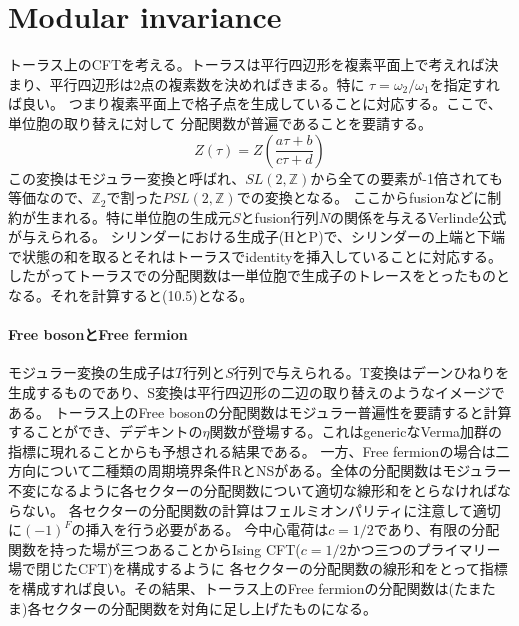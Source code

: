 \documentclass[11pt, aps, longbibliography]{article}
\numberwithin{equation}{section}
\begin{document}
    \section{Modular invariance}
    トーラス上のCFTを考える。トーラスは平行四辺形を複素平面上で考えれば決まり、平行四辺形は2点の複素数を決めればきまる。特に
    $\tau = \omega_2/\omega_1$を指定すれば良い。
    つまり複素平面上で格子点を生成していることに対応する。ここで、単位胞の取り替えに対して
    分配関数が普遍であることを要請する。
    \begin{equation}
        Z(\tau) = Z(\frac{a\tau+ b}{c\tau + d})
    \end{equation}
    この変換はモジュラー変換と呼ばれ、$SL(2,\mathbb{Z})$から全ての要素が-1倍されても等価なので、$\mathbb{Z}_2$で割った$PSL(2,\mathbb{Z})$での変換となる。
    ここからfusionなどに制約が生まれる。特に単位胞の生成元$S$とfusion行列$N$の関係を与えるVerlinde公式が与えられる。
    シリンダーにおける生成子(HとP)で、シリンダーの上端と下端で状態の和を取るとそれはトーラスでidentityを挿入していることに対応する。
    したがってトーラスでの分配関数は一単位胞で生成子のトレースをとったものとなる。それを計算すると(10.5)となる。

    \paragraph{Free bosonとFree fermion}
    モジュラー変換の生成子は$T$行列と$S$行列で与えられる。T変換はデーンひねりを生成するものであり、S変換は平行四辺形の二辺の取り替えのようなイメージである。
    トーラス上のFree bosonの分配関数はモジュラー普遍性を要請すると計算することができ、デデキントの$\eta$関数が登場する。これはgenericなVerma加群の指標に現れることからも予想される結果である。
    一方、Free fermionの場合は二方向について二種類の周期境界条件RとNSがある。全体の分配関数はモジュラー不変になるように各セクターの分配関数について適切な線形和をとらなければならない。
    各セクターの分配関数の計算はフェルミオンパリティに注意して適切に$(-1)^F$の挿入を行う必要がある。
    今中心電荷は$c=1/2$であり、有限の分配関数を持った場が三つあることからIsing CFT($c=1/2$かつ三つのプライマリー場で閉じたCFT)を構成するように
    各セクターの分配関数の線形和をとって指標を構成すれば良い。その結果、トーラス上のFree fermionの分配関数は(たまたま)各セクターの分配関数を対角に足し上げたものになる。
\end{document}
